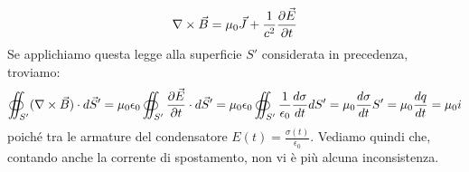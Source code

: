 \documentclass[]{article}
\begin{document}
\begin{equation}
	\nabla\times\vec{B} = \mu_0 \vec{J} + \frac{1}{c^2} \frac{\partial\vec{E}}{\partial t}
	\label{eq:48}
\end{equation}
%
Se applichiamo questa legge alla superficie $ S' $ considerata in precedenza, troviamo:
\begin{equation}
	\oiint_{S'} (\nabla\times\vec{B}) \cdot d\vec{S}' = \mu_0 \epsilon_0 \oiint_{S'} \frac{\partial\vec{E}}{\partial t} \cdot d\vec{S}' = \mu_0 \epsilon_0 \oiint_{S'} \frac{1}{\epsilon_0} \frac{d\sigma}{dt} dS' = \mu_0 \frac{d\sigma}{dt} S' = \mu_0 \frac{dq}{dt} = \mu_0 i
	\label{eq:49}
\end{equation}
poiché tra le armature del condensatore $ E(t) = \frac{\sigma(t)}{\epsilon_0} $. Vediamo quindi che, contando anche la corrente di spostamento, non vi è più alcuna inconsistenza.
\end{document}
